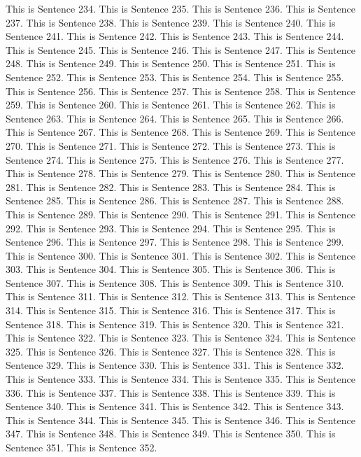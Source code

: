 \documentclass{article}
\begin{document}
This is Sentence 234.
This is Sentence 235.
This is Sentence 236.
This is Sentence 237.
This is Sentence 238.
This is Sentence 239.
This is Sentence 240.
This is Sentence 241.
This is Sentence 242.
This is Sentence 243.
This is Sentence 244.
This is Sentence 245.
This is Sentence 246.
This is Sentence 247.
This is Sentence 248.
This is Sentence 249.
This is Sentence 250.
This is Sentence 251.
This is Sentence 252.
This is Sentence 253.
This is Sentence 254.
This is Sentence 255.
This is Sentence 256.
This is Sentence 257.
This is Sentence 258.
This is Sentence 259.
This is Sentence 260.
This is Sentence 261.
This is Sentence 262.
This is Sentence 263.
This is Sentence 264.
This is Sentence 265.
This is Sentence 266.
This is Sentence 267.
This is Sentence 268.
This is Sentence 269.
This is Sentence 270.
This is Sentence 271.
This is Sentence 272.
This is Sentence 273.
This is Sentence 274.
This is Sentence 275.
This is Sentence 276.
This is Sentence 277.
This is Sentence 278.
This is Sentence 279.
This is Sentence 280.
This is Sentence 281.
This is Sentence 282.
This is Sentence 283.
This is Sentence 284.
This is Sentence 285.
This is Sentence 286.
This is Sentence 287.
This is Sentence 288.
This is Sentence 289.
This is Sentence 290.
This is Sentence 291.
This is Sentence 292.
This is Sentence 293.
This is Sentence 294.
This is Sentence 295.
This is Sentence 296.
This is Sentence 297.
This is Sentence 298.
This is Sentence 299.
This is Sentence 300.
This is Sentence 301.
This is Sentence 302.
This is Sentence 303.
This is Sentence 304.
This is Sentence 305.
This is Sentence 306.
This is Sentence 307.
This is Sentence 308.
This is Sentence 309.
This is Sentence 310.
This is Sentence 311.
This is Sentence 312.
This is Sentence 313.
This is Sentence 314.
This is Sentence 315.
This is Sentence 316.
This is Sentence 317.
This is Sentence 318.
This is Sentence 319.
This is Sentence 320.
This is Sentence 321.
This is Sentence 322.
This is Sentence 323.
This is Sentence 324.
This is Sentence 325.
This is Sentence 326.
This is Sentence 327.
This is Sentence 328.
This is Sentence 329.
This is Sentence 330.
This is Sentence 331.
This is Sentence 332.
This is Sentence 333.
This is Sentence 334.
This is Sentence 335.
This is Sentence 336.
This is Sentence 337.
This is Sentence 338.
This is Sentence 339.
This is Sentence 340.
This is Sentence 341.
This is Sentence 342.
This is Sentence 343.
This is Sentence 344.
This is Sentence 345.
This is Sentence 346.
This is Sentence 347.
This is Sentence 348.
This is Sentence 349.
This is Sentence 350.
This is Sentence 351.
This is Sentence 352.
\end{document}

